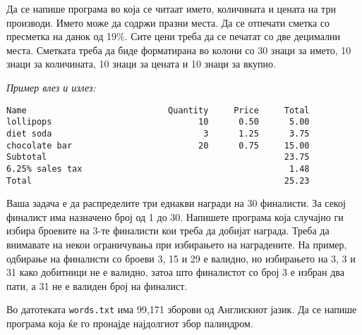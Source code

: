 

\lfoot{}
\cfoot{\thepage}
\rfoot{}
\usepackage{fancyvrb}
\usepackage{xcolor}
\usepackage{textcomp}


\begin{questions}


\question
Да се напише програма во која се читаат името, количината и цената на три
производи. Името може да содржи празни места. Да се отпечати сметка со пресметка
на данок од 19\%. Сите цени треба да се печатат со две децимални места. Сметката
треба да биде форматирана во колони со 30 знаци за името, 10 знаци за
количината, 10 знаци за цената и 10 знаци за вкупно. 

\emph{Пример влез и излез:}

\begin{verbatim}
Name                            Quantity     Price     Total
lollipops                             10      0.50      5.00
diet soda                              3      1.25      3.75
chocolate bar                         20      0.75     15.00
Subtotal                                               23.75
6.25% sales tax                                         1.48
Total                                                  25.23
\end{verbatim}



\question
Ваша задача е да распределите три еднакви награди на 30 финалисти. За секој
финалист има назначено број од 1 до 30. Напишете програма која случајно ги
избира броевите на 3-те финалисти кои треба да добијат награда. Треба да
внимавате на некои ограничувања при избирањето на наградените. На пример,
одбирање на финалисти со броеви 3, 15 и 29 е валидно, но избирањето на 3, 3 и 31 како
добитници не е валидно, затоа што финалистот со број 3 е избран два пати, а 31
не е валиден број на финалист.



\question
Во датотеката \texttt{words.txt} има 99,171 зборови од Англискиот јазик. Да се
напише програма која ќе го пронајде најдолгиот збор палиндром.




\end{questions}
